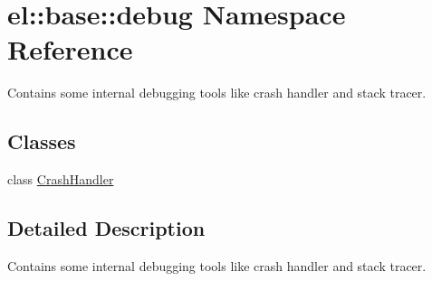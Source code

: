 \hypertarget{namespaceel_1_1base_1_1debug}{\section{el\-:\-:base\-:\-:debug Namespace Reference}
\label{namespaceel_1_1base_1_1debug}
}


Contains some internal debugging tools like crash handler and stack tracer.  


\subsection*{Classes}
\begin{DoxyCompactItemize}
\item 
class \hyperlink{classel_1_1base_1_1debug_1_1CrashHandler}{Crash\-Handler}
\end{DoxyCompactItemize}


\subsection{Detailed Description}
Contains some internal debugging tools like crash handler and stack tracer. 